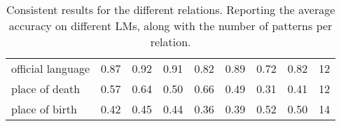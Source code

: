 \begin{table*}[t]
{\begin{tabular}{lrrrrrrrr}
                    official language &       0.87 &        0.92 &            0.91 &          0.82 &          0.89 &         0.72 &            0.82 &  12 \\
                       place of death &       0.57 &        0.64 &            0.50 &          0.66 &          0.49 &         0.31 &            0.41 &  12 \\
                       place of birth &       0.42 &        0.45 &            0.44 &          0.36 &          0.39 &         0.52 &            0.50 &  14 \\
\bottomrule
\end{tabular}
}
    \caption{Consistent results for the different relations. Reporting the average accuracy on different LMs, along with the number of patterns per relation.}
    \label{tab:entailment-main}
\end{table*}